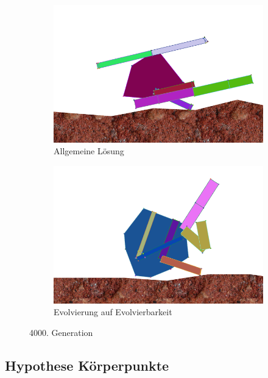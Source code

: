       \begin{figure}[H]
        \centering
        \begin{subfigure}[b]{0.45\textwidth}
          \includegraphics[width=\linewidth,center]{graphics/simulation-discussion/4_gen4000}
          \caption{Allgemeine Lösung\label{fig:gen4000_alg}}
        \end{subfigure}
        \begin{subfigure}[b]{0.45\textwidth}
          \includegraphics[width=\linewidth,center]{graphics/simulation-discussion/5_gen4000}
          \caption{Evolvierung auf Evolvierbarkeit\label{fig:gen4000_ev}}
        \end{subfigure}

        \caption{4000. Generation\label{fig:gen4000}}
      \end{figure}


    \subsection{Hypothese Körperpunkte\label{sub:PerspectiveHypBodyPoints}}

